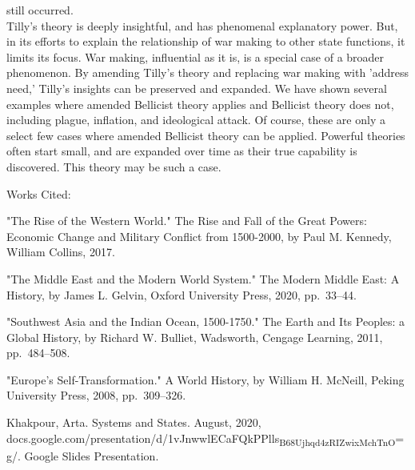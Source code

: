 \documentclass[letterpaper]{article}
\begin{document}
still occurred.\\
Tilly's theory is deeply insightful, and has phenomenal explanatory
power. But, in its efforts to explain the relationship of war making to
other state functions, it limits its focus. War making, influential as
it is, is a special case of a broader phenomenon. By amending Tilly's
theory and replacing war making with 'address need,' Tilly's insights
can be preserved and expanded. We have shown several examples where
amended Bellicist theory applies and Bellicist theory does not,
including plague, inflation, and ideological attack. Of course, these
are only a select few cases where amended Bellicist theory can be
applied. Powerful theories often start small, and are expanded over time
as their true capability is discovered. This theory may be such a case.

Works Cited:

"The Rise of the Western World." The Rise and Fall of the Great Powers:
Economic Change and Military Conflict from 1500-2000, by Paul M.
Kennedy, William Collins, 2017.

"The Middle East and the Modern World System." The Modern Middle East: A
History, by James L. Gelvin, Oxford University Press, 2020, pp. 33--44.

"Southwest Asia and the Indian Ocean, 1500-1750." The Earth and Its
Peoples: a Global History, by Richard W. Bulliet, Wadsworth, Cengage
Learning, 2011, pp. 484--508.

"Europe's Self-Transformation." A World History, by William H. McNeill,
Peking University Press, 2008, pp. 309--326.

Khakpour, Arta. Systems and States. August, 2020,
docs.google.com/presentation/d/1vJnwwlECaFQkPPlls\textsubscript{B68Ujhqd4zRIZwixMch}\textsubscript{TnO}=g/.
Google Slides Presentation.
\end{document}
